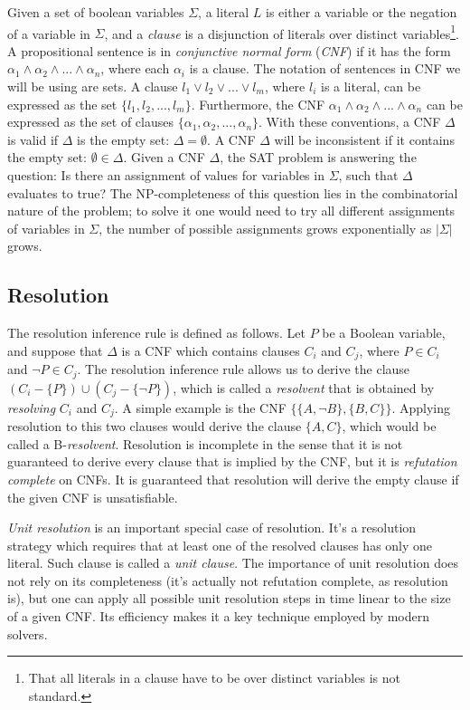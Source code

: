 \documentclass[12pt]{diicc}
\begin{document}
Given a set of boolean variables $\Sigma$, a literal $L$ is either a variable or the negation of a variable in $\Sigma$, and a \textit{clause} is a disjunction of literals over distinct variables\footnote[1]{That all literals in a clause have to be over distinct variables is not standard.}. A propositional sentence is in \textit{conjunctive normal form} (\textit{CNF}) if it has the form $\alpha_{1} \wedge \alpha_{2} \wedge ... \wedge \alpha_{n}$, where each $\alpha_{i}$ is a clause. The notation of sentences in CNF we will be using are sets. A clause $l_{1} \vee l_{2} \vee ... \vee l_{m}$, where $l_{i}$ is a literal, can be expressed as the set $\{l_{1},l_{2},...,l_{m}\}$. Furthermore, the CNF $\alpha_{1} \wedge \alpha_{2} \wedge ... \wedge \alpha_{n}$ can be expressed as the set of clauses $\{\alpha_{1},\alpha_{2},...,\alpha_{n}\}$. With these conventions, a CNF $\Delta$ is valid if $\Delta$ is the empty set: $\Delta = \emptyset$. A CNF $\Delta$ will be inconsistent if it contains the empty set: $\emptyset \in \Delta$. 
Given a CNF $\Delta$, the SAT problem is answering the question: Is there an assignment of values for variables in $\Sigma$, such that $\Delta$ evaluates to true? The NP-completeness of this question lies in the combinatorial nature of the problem; to solve it one would need to try all different assignments of variables in $\Sigma$, the number of possible assignments grows exponentially as $|\Sigma|$ grows.

\subsection{Resolution}
The resolution inference rule \cite{Rob65} is defined as follows. Let $P$ be a Boolean variable, and suppose that $\Delta$ is a CNF which contains clauses $C_{i}$ and $C_{j}$, where $P \in C_{i}$ and $\neg P \in C_{j}$. The resolution inference rule allows us to derive the clause $(C_{i}-\{P\})\cup (C_{j}-\{\neg P\})$, which is called a \textit{resolvent} that is obtained by \textit{resolving} $C_{i}$ and $C_{j}$. A simple example is the CNF $\{\{A,\neg B\},\{B,C\}\}$. Applying resolution to this two clauses would derive the clause $\{A,C\}$, which would be called a B-\textit{resolvent}.
Resolution is incomplete in the sense that it is not guaranteed to derive every clause that is implied by the CNF, but it is \textit{refutation complete} on CNFs. It is guaranteed that resolution will derive the empty clause if the given CNF is unsatisfiable. 

\textit{Unit resolution} is an important special case of resolution. It's a resolution strategy which requires that at least one of the resolved clauses has only one literal. Such clause is called a \textit{unit clause}. The importance of unit resolution does not rely on its completeness (it's actually not refutation complete, as resolution is), but one can apply all possible unit resolution steps in time linear to the size of a given CNF. Its efficiency makes it a key technique employed by modern solvers.
\end{document}

